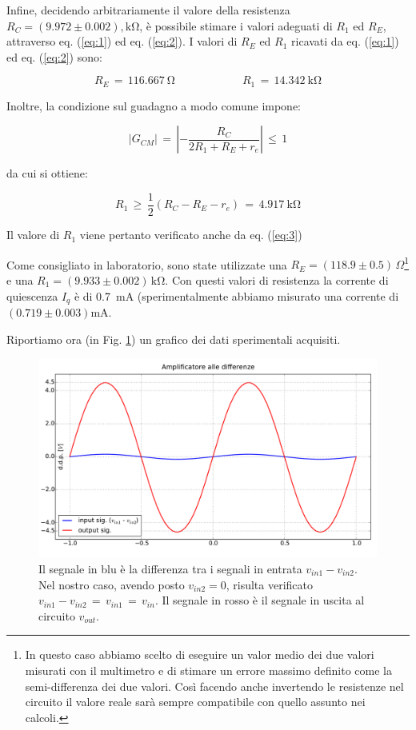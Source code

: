Infine, decidendo arbitrariamente il valore della resistenza $R_C=(9.972\pm0.002),\si{\kilo\ohm}$, è possibile stimare i valori adeguati di $R_1$ ed $R_E$, attraverso eq. (\ref{eq:1}) ed eq. (\ref{eq:2}). 
I valori di $R_E$ ed $R_1$ ricavati da eq. (\ref{eq:1}) ed eq. (\ref{eq:2}) sono:

$$R_E \, = \, \SI{116.667}{\ohm} \qquad \qquad \qquad R_1 \, = \, \SI{14.342}{\kilo\ohm}$$

\noindent Inoltre, la condizione sul guadagno a modo comune impone:

\begin{equation}
	\left| G_{CM} \right| \, = \, \left|  - \frac{R_C}{2 R_1 + R_E + r_e} \right| \, \leq \, 1
	\label{eq:3}
\end{equation}

da cui si ottiene:

$$	R_1 \, \geq \, \frac{1}{2} \left( R_C - R_E - r_e \right) \, = \, \SI{4.917}{\kilo\ohm}	$$

\noindent Il valore di $R_1$ viene pertanto verificato anche da eq. (\ref{eq:3})

Come consigliato in laboratorio, sono state utilizzate una $R_E=(118.9\pm0.5) \,\Omega$\footnote{In questo caso abbiamo scelto di eseguire un valor medio dei due valori misurati con il multimetro e di stimare un errore massimo definito come la semi-differenza dei due valori. Così facendo anche invertendo le resistenze nel circuito il valore reale sarà sempre compatibile con quello assunto nei calcoli.} e una $R_1= (9.933 \pm 0.002)\,\si{\kilo\ohm}$.
Con questi valori di resistenza la corrente di quiescenza $I_q$ è di \SI{0.7}{\milli\ampere} (sperimentalmente abbiamo misurato una corrente di $(0.719 \pm 0.003) \si{\milli\ampere}$.

Riportiamo ora (in Fig. \ref{fig:sig}) un grafico dei dati sperimentali acquisiti. 

\begin{figure}[h]
\centering
	\includegraphics[scale=0.40025]{accontentati.pdf}
	\caption{Il segnale in blu è la differenza tra i segnali in entrata $v_{in1} - v_{in2}$. Nel nostro caso, avendo posto $v_{in2} = 0$, risulta verificato $v_{in1} - v_{in2} \,=\, v_{in1} \,=\, v_{in}$. Il segnale in rosso è il segnale in uscita al circuito $v_{out}$.}
	\label{fig:sig}
\end{figure}

